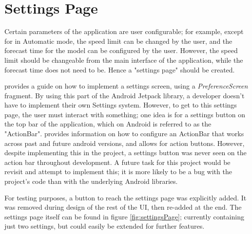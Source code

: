 \documentclass[11pt, a4paper, notitlepage]{report}
\begin{document}
\section{Settings Page}
Certain parameters of the application are user configurable; for example, except for in Automatic mode, the speed limit can be changed by the user, and the forecast time for the model can be configured by the user. However, the speed limit should be changeable from the main interface of the application, while the forecast time does not need to be. Hence a "settings page" should be created.

\citet{settingsAndroid} provides a guide on how to implement a settings screen, using a \textit{PreferenceScreen} fragment. By using this part of the Android Jetpack library, a developer doesn't have to implement their own Settings system. However, to get to this settings page, the user must interact with something; one idea is for a settings button on the top bar of the application, which on Android is referred to as the "ActionBar". \citet{toolbarAndroid} provides information on how to configure an ActionBar that works across past and future android versions, and allows for action buttons. However, despite implementing this in the project, a settings button was never seen on the action bar throughout development. A future task for this project would be revisit and attempt to implement this; it is more likely to be a bug with the project's code than with the underlying Android libraries.

For testing purposes, a button to reach the settings page was explicitly added. It was removed during design of the rest of the UI, then re-added at the end. The settings page itself can be found in figure \ref{fig:settingsPage}; currently containing just two settings, but could easily be extended for further features.
\end{document}
